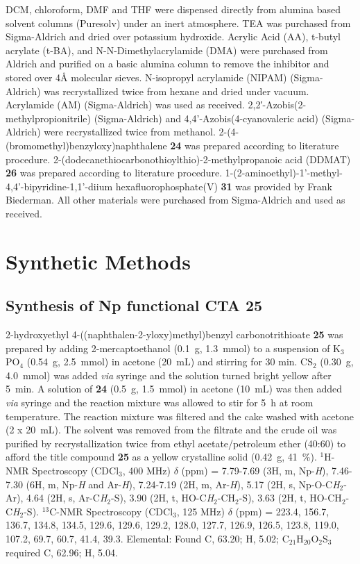 \documentclass[a4wide,12pt]{report} %
\begin{document}
DCM, chloroform, DMF and THF were dispensed directly from alumina based solvent columns (Puresolv) under an inert atmosphere. 
%
TEA was purchased from Sigma-Aldrich and dried over potassium hydroxide. 
%
Acrylic Acid (AA), t-butyl acrylate (t-BA), and N-N-Dimethylacrylamide (DMA) were purchased from Aldrich and purified on a basic alumina column to remove the inhibitor and stored over {4\AA} molecular sieves.
%
N-isopropyl acrylamide (NIPAM) (Sigma-Aldrich) was recrystallized twice from hexane and dried under vacuum. 
%
Acrylamide (AM) (Sigma-Aldrich) was used as received.
%
2,2′-Azobis(2-methylpropionitrile) (Sigma-Aldrich) and 4,4'-Azobis(4-cyanovaleric acid) (Sigma-Aldrich) were recrystallized twice from methanol. 
%
2-(4-(bromomethyl)benzyloxy)naphthalene  {\bf 24} was prepared according to literature procedure.\cite{Kim:2004p1558}
%
2-(dodecanethiocarbonothioylthio)-2-methylpropanoic acid (DDMAT) {\bf 26} was prepared according to literature procedure.\cite{Skey:2008p4456}
%
1-(2-aminoethyl)-1'-methyl-4,4'-bipyridine-1,1'-diium hexafluorophosphate(V)  {\bf 31} was provided by Frank Biederman.
%
All other materials were purchased from Sigma-Aldrich and used as received.





\section{Synthetic Methods}


\vspace{.3 in}
\subsection{Synthesis of Np functional CTA {\bf 25}}
%
2-hydroxyethyl 4-((naphthalen-2-yloxy)methyl)benzyl carbonotrithioate  {\bf 25} was prepared by adding 2-mercaptoethanol (0.1~g, 1.3~mmol) to a suspension of K$_3$PO$_4$ (0.54~g, 2.5~mmol) in acetone (20~mL) and stirring for 30 min. 
%
CS$_2$ (0.30~g, 4.0~mmol) was added {\it via} syringe and the solution turned bright yellow after 5~min.
%
A solution of {\bf 24} (0.5~g, 1.5~mmol) in acetone (10~mL) was then added {\it via} syringe and the reaction mixture was allowed to stir for 5~h at room temperature. 
%
The reaction mixture was filtered and the cake washed with acetone (2 x 20~mL). 
%
The solvent was removed from the filtrate and the crude oil was purified by recrystallization twice from ethyl acetate/petroleum ether (40:60) to afford the title compound {\bf 25} as a yellow crystalline solid (0.42~g, 41~\%). 
%
$^1$H-NMR Spectroscopy (CDCl$_3$, 400 MHz) $\delta$ (ppm) = 7.79-7.69 (3H, m, Np-{\it H}), 7.46-7.30 (6H, m, Np-{\it H} and Ar-{\it H}), 7.24-7.19 (2H, m, Ar-{\it H}), 5.17 (2H, s, Np-O-C{\it H}$_2$-Ar), 4.64 (2H, s, Ar-C{\it H}$_2$-S), 3.90 (2H, t, HO-C{\it H}$_2$-CH$_2$-S), 3.63 (2H, t, HO-CH$_2$-C{\it H}$_2$-S).
%
$^{13}$C-NMR Spectroscopy (CDCl$_3$, 125 MHz) $\delta$ (ppm) = 223.4, 156.7, 136.7, 134.8, 134.5, 129.6, 129.6, 129.2, 128.0, 127.7, 126.9, 126.5, 123.8, 119.0, 107.2, 69.7, 60.7, 41.4, 39.3.
%
%
Elemental: Found C, 63.20; H, 5.02; C$_{21}$H$_{20}$O$_2$S$_3$ required C, 62.96; H, 5.04.
%
\end{document}
